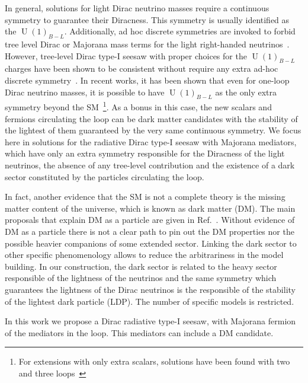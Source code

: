 \documentclass[12pt]{article}
\begin{document}
In general, solutions for light Dirac neutrino masses require a
continuous symmetry to guarantee their Diracness. This symmetry is
usually identified as the $\operatorname{U}(1)_{B-L}$.  Additionally,
ad hoc discrete symmetries are invoked to forbid tree level Dirac or
Majorana mass terms for the light right-handed
neutrinos~\cite{Roncadelli:1983ty,Han:2018zcn,Wang:2017mcy}. 
However, tree-level Dirac type-I seesaw with proper choices for the
$\operatorname{U}(1)_{B-L}$ charges have been shown to be consistent
without require any extra ad-hoc discrete symmetry~\cite{Ma:2014qra}.
In recent works, it has been shown that even for one-loop Dirac
neutrino masses, it is possible to have $\operatorname{U}(1)_{B-L}$ as
the only extra symmetry beyond the SM~\cite{Calle:2018ovc,
  Bonilla:2018ynb, Saad:2019bqf}\footnote{
  For extensions with only extra scalars, solutions have been found with two and three loops~\cite{Saad:2019bqf}}.
As a bonus in this case, the new scalars and fermions circulating the
loop can be dark matter candidates with the stability of the lightest
of them guaranteed by the very same continuous symmetry.
We focus here in solutions for the radiative Dirac type-I seesaw with
Majorana mediators, which have only an extra symmetry responsible for the
Diracness of the light neutrinos, the absence of any tree-level
contribution and the existence of a dark sector constituted by the
particles circulating the loop.

In fact, another evidence that the SM is not a complete theory is the
missing matter content of the universe, which is known as dark matter
(DM).
The main proposals that explain DM as a particle are given in
Ref.~\cite{Bertone:2004pz}.
Without evidence of DM as a particle there is not a clear path to pin
out the DM properties nor the possible heavier companions of some
extended sector. 
Linking the dark sector to other specific phenomenology allows to
reduce the arbitrariness in the model building.
In our construction, the dark sector is related to the heavy sector
responsible of the lightness of the neutrinos and the same symmetry
which guarantees the lightness of the Dirac neutrinos is the
responsible of the stability of the lightest dark particle (LDP).
The number of specific models is restricted.

In this work we propose a Dirac radiative type-I seesaw, with Majorana
fermion of the mediators in the loop. This mediators can include a DM
candidate.
\end{document}
